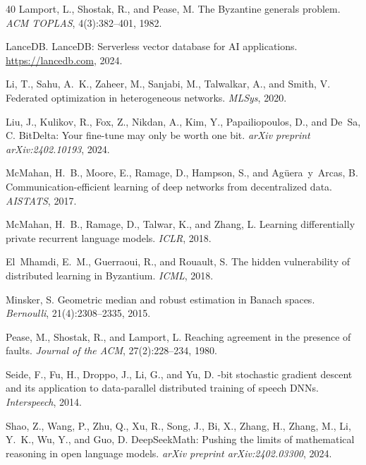 \begin{thebibliography}{40}
Lamport, L., Shostak, R., and Pease, M.
\newblock The Byzantine generals problem.
\newblock \emph{ACM TOPLAS}, 4(3):382--401, 1982.

LanceDB.
\newblock LanceDB: Serverless vector database for AI applications.
\newblock \url{https://lancedb.com}, 2024.

Li, T., Sahu, A.~K., Zaheer, M., Sanjabi, M., Talwalkar, A., and
  Smith, V.
\newblock Federated optimization in heterogeneous networks.
\newblock \emph{MLSys}, 2020.

Liu, J., Kulikov, R., Fox, Z., Nikdan, A., Kim, Y., Papailiopoulos, D.,
  and De~Sa, C.
\newblock BitDelta: Your fine-tune may only be worth one bit.
\newblock \emph{arXiv preprint arXiv:2402.10193}, 2024.

McMahan, H.~B., Moore, E., Ramage, D., Hampson, S., and
  Ag{\"u}era~y~Arcas, B.
\newblock Communication-efficient learning of deep networks from decentralized
  data.
\newblock \emph{AISTATS}, 2017.

McMahan, H.~B., Ramage, D., Talwar, K., and Zhang, L.
\newblock Learning differentially private recurrent language models.
\newblock \emph{ICLR}, 2018.

El~Mhamdi, E.~M., Guerraoui, R., and Rouault, S.
\newblock The hidden vulnerability of distributed learning in Byzantium.
\newblock \emph{ICML}, 2018.

Minsker, S.
\newblock Geometric median and robust estimation in Banach spaces.
\newblock \emph{Bernoulli}, 21(4):2308--2335, 2015.

Pease, M., Shostak, R., and Lamport, L.
\newblock Reaching agreement in the presence of faults.
\newblock \emph{Journal of the ACM}, 27(2):228--234, 1980.

Seide, F., Fu, H., Droppo, J., Li, G., and Yu, D.
-bit stochastic gradient descent and its application to
  data-parallel distributed training of speech DNNs.
\newblock \emph{Interspeech}, 2014.

Shao, Z., Wang, P., Zhu, Q., Xu, R., Song, J., Bi, X., Zhang, H., Zhang, M.,
  Li, Y.~K., Wu, Y., and Guo, D.
\newblock DeepSeekMath: Pushing the limits of mathematical reasoning in open
  language models.
\newblock \emph{arXiv preprint arXiv:2402.03300}, 2024.


\end{thebibliography}
